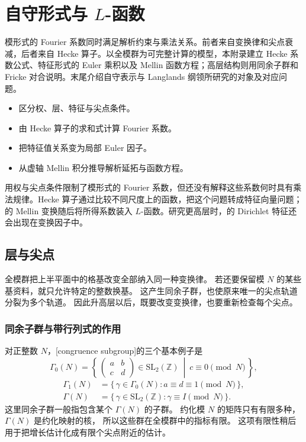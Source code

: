 \chapter{自守形式与 \texorpdfstring{\(L\)}{L}-函数}
\label{b3:app:E}
\begin{chapterabstract}
模形式的 Fourier 系数同时满足解析约束与乘法关系。前者来自变换律和尖点衰减，后者来自 Hecke 算子。以全模群为可完整计算的模型，本附录建立 Hecke 系数公式、特征形式的 Euler 乘积以及 Mellin 函数方程；高层结构则用同余子群和 Fricke 对合说明。末尾介绍自守表示与 Langlands 纲领所研究的对象及对应问题。
\end{chapterabstract}
\begin{learninggoals}
\begin{itemize}
\item\label{b3:item:E-goal-1}区分权、层、特征与尖点条件。
\item\label{b3:item:E-goal-2}由 Hecke 算子的求和式计算 Fourier 系数。
\item\label{b3:item:E-goal-3}把特征值关系变为局部 Euler 因子。
\item\label{b3:item:E-goal-4}从虚轴 Mellin 积分推导解析延拓与函数方程。
\end{itemize}
\end{learninggoals}
用权与尖点条件限制了模形式的 Fourier 系数，但还没有解释这些系数何时具有乘法规律。Hecke 算子通过比较不同尺度上的函数，把这个问题转成特征向量问题；的 Mellin 变换随后将所得系数装入 \(L\)-函数。研究更高层时，的 Dirichlet 特征还会出现在变换因子中。

\section{层与尖点}
\label{b3:sec:E01}

全模群把上半平面中的格基改变全部纳入同一种变换律。
若还要保留模 \(N\) 的某些基资料，就只允许特定的整数换基。
这产生同余子群，也使原来唯一的尖点轨道分裂为多个轨道。
因此升高层以后，既要改变变换律，也要重新检查每个尖点。

\subsection{同余子群与带行列式的作用}
\label{b3:subsec:E0101}

对正整数 \(N\)，[congruence subgroup]的三个基本例子是
\[
 \Gamma_0(N)=\left\{\,\begin{pmatrix}a&b\\c&d\end{pmatrix}
 \in\mathrm{SL}_2(\mathbb Z)\ \middle|\ c\equiv0\pmod N\,\right\},
\]
\[
 \begin{aligned}
 \Gamma_1(N)&=\{\,\gamma\in\Gamma_0(N):a\equiv d\equiv1\pmod N\,\},\\
 \Gamma(N)&=\{\,\gamma\in\mathrm{SL}_2(\mathbb Z):\gamma\equiv I\pmod N\,\}.
 \end{aligned}
\]
这里同余子群一般指包含某个 \(\Gamma(N)\) 的子群。
约化模 \(N\) 的矩阵只有有限多种，\(\Gamma(N)\) 是约化映射的核，
所以这些群在全模群中的指标有限。
这项有限性稍后用于把增长估计化成有限个尖点附近的估计。

